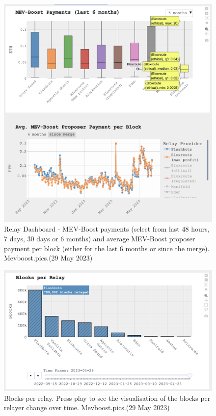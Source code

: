 \documentclass[UTF8]{article}
\begin{document}
\begin{figure}[htbp]
\begin{center}
\includegraphics[width=0.9\linewidth]{images/mevrelay3}
\caption{Relay Dashboard - MEV-Boost payments (select from last 48 hours, 7 days, 30 days or 6 months) and average MEV-Boost proposer payment per block (either for the last 6 months or since the merge). Mevboost.pics.(29 May 2023)}
\label{fig:mevrelay3}
\end{center}
\end{figure}

\begin{figure}[htbp]
\begin{center}
\includegraphics[width=0.9\linewidth]{images/mevrelay4}
\caption{Blocks per relay. Press play to see the visualisation of the blocks per relayer change over time. Mevboost.pics.(29 May 2023)}
\label{fig:mevrelay4}
\end{center}
\end{figure}
\end{document}

